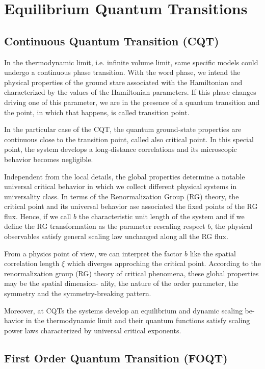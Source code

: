 \section{Equilibrium Quantum Transitions}

\subsection{Continuous Quantum Transition (CQT)}
\label{CQTeq}

In the thermodynamic limit, i.e. infinite volume limit, same specific models could undergo a continuous phase transition. With the word phase, we intend the physical properties of the ground stare associated with the Hamiltonian and characterized by the values of the Hamiltonian parameters. If this phase changes driving one of this parameter, we are in the presence of a quantum transition and the point, in which that happens, is called transition point.

In the particular case of the CQT, the quantum ground-state properties are continuous close to the transition point, called also critical point. 
In this special point, the system develops a long-distance correlations and its microscopic behavior becomes negligible.

Independent from the local details, the global properties determine a notable universal critical behavior in which we collect different physical systems in universality class.
In terms of the Renormalization Group (RG) theory, the critical point and its universal behavior ase associated the fixed points of the RG flux. Hence, if we call $b$ the characteristic unit length of the system and if we define the RG transformation as the parameter rescaling respect $b$, the physical observables satisfy general scaling law unchanged along all the RG flux.

From a physics point of view, we can interpret the factor $b$ like the spatial correlation length $\xi$ which diverges approching the critical point.
According to the renormalization group (RG)
theory of critical phenomena, these global properties may be the spatial dimension-
ality, the nature of the order parameter, the symmetry and the symmetry-breaking
pattern.

Moreover, at CQTs the systems develop an equilibrium and dynamic scaling be-
havior in the thermodynamic limit and their quantum functions satisfy scaling
power laws characterized by universal critical exponents.

\subsection{First Order Quantum Transition (FOQT)}
\label{FOQTeq}

